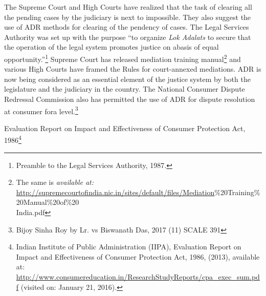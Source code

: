\begin{multicols}{2}

\noi
The Supreme Court and High Courts have realized that the task of clearing all the pending cases
by the judiciary is next to impossible. They also suggest the use of ADR methods for clearing
of the pendency of cases. The Legal Services Authority was set up with the purpose “to
organize \textit{Lok Adalats} to secure that the operation of the legal system promotes justice on abasis
of equal opportunity.”\footnote{Preamble to the Legal Services Authority, 1987.} Supreme Court has released mediation training manual\footnote{The same is \textit{available at:}\\ \url{http://supremecourtofindia.nic.in/sites/default/files/Mediation}\%20Training\%20Manual\%20of\%20\\India.pdf} and various High Courts have framed the Rules for court-annexed mediations. ADR is now being considered as an essential element of the justice system by both the legislature and the judiciary in the country. The National Consumer Dispute Redressal Commission also has permitted the use of ADR for dispute resolution at consumer fora level.\footnote{Bijoy Sinha Roy by Lr. vs Biswanath Das, 2017 (11) SCALE 391}

\newpage
{}

\vspace{-.2cm}

\noi
Evaluation Report on Impact and Effectiveness of Consumer Protection Act, 1986\footnote{Indian Institute of Public Administration (IIPA), Evaluation Report on Impact and Effectiveness of Consumer  Protection Act, 1986, (2013), available at: \url{http://www.consumereducation.in/ResearchStudyReports/cpa_exec_sum.pdf} (visited on: January 21, 2016).}


\end{multicols}
